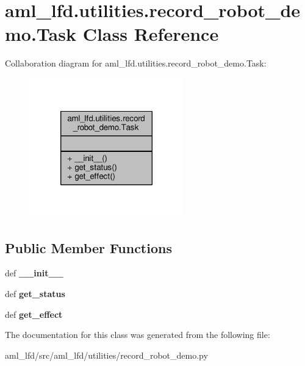 \hypertarget{classaml__lfd_1_1utilities_1_1record__robot__demo_1_1_task}{\section{aml\-\_\-lfd.\-utilities.\-record\-\_\-robot\-\_\-demo.\-Task Class Reference}
\label{classaml__lfd_1_1utilities_1_1record__robot__demo_1_1_task}
}


Collaboration diagram for aml\-\_\-lfd.\-utilities.\-record\-\_\-robot\-\_\-demo.\-Task\-:\nopagebreak
\begin{figure}[H]
\begin{center}
\leavevmode
\includegraphics[width=190pt]{classaml__lfd_1_1utilities_1_1record__robot__demo_1_1_task__coll__graph}
\end{center}
\end{figure}
\subsection*{Public Member Functions}
\begin{DoxyCompactItemize}
\item 
\hypertarget{classaml__lfd_1_1utilities_1_1record__robot__demo_1_1_task_a6a473df90cd6f831f722eb229ec77ab4}{def {\bfseries \-\_\-\-\_\-init\-\_\-\-\_\-}}\label{classaml__lfd_1_1utilities_1_1record__robot__demo_1_1_task_a6a473df90cd6f831f722eb229ec77ab4}

\item 
\hypertarget{classaml__lfd_1_1utilities_1_1record__robot__demo_1_1_task_ab85fcc46aa96fe3746fcdedf203a156d}{def {\bfseries get\-\_\-status}}\label{classaml__lfd_1_1utilities_1_1record__robot__demo_1_1_task_ab85fcc46aa96fe3746fcdedf203a156d}

\item 
\hypertarget{classaml__lfd_1_1utilities_1_1record__robot__demo_1_1_task_a5991a4170ea88137b6672c6568e27b8c}{def {\bfseries get\-\_\-effect}}\label{classaml__lfd_1_1utilities_1_1record__robot__demo_1_1_task_a5991a4170ea88137b6672c6568e27b8c}

\end{DoxyCompactItemize}


The documentation for this class was generated from the following file\-:\begin{DoxyCompactItemize}
\item 
aml\-\_\-lfd/src/aml\-\_\-lfd/utilities/record\-\_\-robot\-\_\-demo.\-py\end{DoxyCompactItemize}
